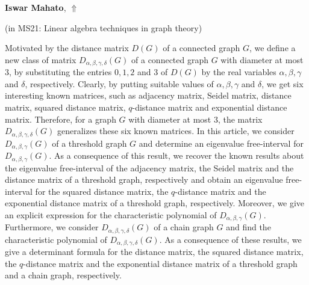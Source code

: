 \documentclass[ILAS2025-program.tex]{subfiles}
\begin{document}
\hypertarget{down0335}{}\begin{ilasabstract}
    
\textbf{Iswar Mahato},  \hfill \hyperlink{up0335}{$\Uparrow$}
    
    
(in {\color{mstitle}MS21: Linear algebra techniques in graph theory})
        
\mtskip
    Motivated by the distance matrix $D(G)$ of a connected graph $G$, we define a new class of matrix $D_{\alpha,\beta,\gamma, \delta}(G)$ of a connected graph $G$ with diameter at most $3$, by substituting the entries $0,1,2$ and $3$ of $D(G)$ by the real variables $\alpha,\beta, \gamma$ and $\delta$, respectively. Clearly, by putting suitable values of $\alpha,\beta, \gamma$ and $\delta$, we get six interesting known matrices, such as adjacency matrix, Seidel matrix, distance matrix, squared distance matrix, $q$-distance matrix and exponential distance matrix. Therefore, for a graph $G$ with diameter at most $3$, the matrix $D_{\alpha,\beta,\gamma, \delta}(G)$ generalizes these six known matrices. In this article, we consider $D_{\alpha,\beta,\gamma}(G)$ of a threshold graph $G$ and determine an eigenvalue free-interval for $D_{\alpha,\beta,\gamma}(G)$. As a consequence of this result, we recover the known results about the eigenvalue free-interval of the adjacency matrix, the Seidel matrix and the distance matrix of a threshold graph, respectively and obtain an eigenvalue free-interval for the squared distance matrix, the $q$-distance matrix and the exponential distance matrix of a threshold graph, respectively. Moreover, we give an explicit expression for the characteristic polynomial of $D_{\alpha,\beta,\gamma}(G)$. Furthermore, we consider $D_{\alpha,\beta,\gamma, \delta}(G)$ of a chain graph $G$ and find the characteristic polynomial of  $D_{\alpha,\beta,\gamma, \delta}(G)$. As a consequence of these results, we give a determinant formula for the distance matrix, the squared distance matrix, the $q$-distance matrix and the exponential distance matrix of a threshold graph and a chain graph, respectively. 
\end{ilasabstract}
    
\end{document}
